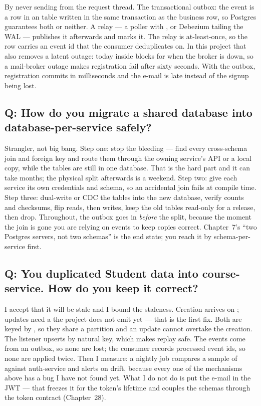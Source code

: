 By never sending from the request thread. The transactional outbox: the
event is a row in an  table written in the same
transaction as the business row, so Postgres guarantees both or
neither. A relay --- a  poller with , or Debezium tailing the WAL --- publishes it afterwards
and marks it. The relay is at-least-once, so the row carries an event id
that the consumer deduplicates on. In this project that also removes a
latent outage: today  inside
 blocks for  when the
broker is down, so a mail-broker outage makes registration fail after
sixty seconds. With the outbox, registration commits in milliseconds and
the e-mail is late instead of the signup being lost.

\subsection*{Q: How do you migrate a shared database into database-per-service safely?}

Strangler, not big bang. Step one: stop the bleeding --- find every
cross-schema join and foreign key and route them through the owning
service's API or a local copy, while the tables are still in one
database. That is the hard part and it can take months; the physical
split afterwards is a weekend. Step two: give each service its own
credentials and schema, so an accidental join fails at compile time.
Step three: dual-write or CDC the tables into the new database, verify
counts and checksums, flip reads, then writes, keep the old tables
read-only for a release, then drop. Throughout, the outbox goes in
\emph{before} the split, because the moment the join is gone you are
relying on events to keep copies correct. Chapter~7's ``two Postgres
servers, not two schemas'' is the end state; you reach it by
schema-per-service first.

\subsection*{Q: You duplicated Student data into course-service. How do you keep it correct?}

I accept that it will be stale and I bound the staleness. Creation
arrives on ; updates need a
 the project does not emit yet --- that is the
first fix. Both are keyed by , so they share a partition and
an update cannot overtake the creation. The listener upserts by natural
key, which makes replay safe. The events come from an outbox, so none
are lost; the consumer records processed event ids, so none are applied
twice. Then I measure: a nightly job compares a sample of
 against auth-service and alerts on drift, because
every one of the mechanisms above has a bug I have not found yet. What I
do not do is put the e-mail in the JWT --- that freezes it for the
token's lifetime and couples the schemas through the token contract
(Chapter~28).

